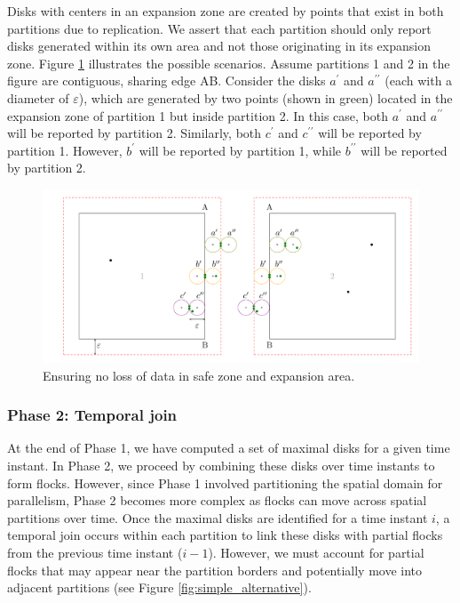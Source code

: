 Disks with centers in an expansion zone are created by points that exist in both partitions due to replication. We assert that each partition should only report disks generated within its own area and not those originating in its expansion zone. Figure \ref{fig:ensuring} illustrates the possible scenarios. Assume partitions 1 and 2 in the figure are contiguous, sharing edge AB. Consider the disks $a^\prime$ and $a^{\prime\prime}$ (each with a diameter of $\varepsilon$), which are generated by two points (shown in green) located in the expansion zone of partition 1 but inside partition 2. In this case, both $a^\prime$ and $a^{\prime\prime}$ will be reported by partition 2. Similarly, both $c^\prime$ and $c^{\prime\prime}$ will be reported by partition 1. However, $b^\prime$ will be reported by partition 1, while $b^{\prime\prime}$ will be reported by partition 2.

\begin{figure}
    \centering
    \includegraphics[width=\linewidth]{figures/merge.pdf}
    \caption{Ensuring no loss of data in safe zone and expansion area.}\label{fig:ensuring}
\end{figure}

\subsubsection{Phase 2: Temporal join}\label{sec:temporal_join}
At the end of Phase 1, we have computed a set of maximal disks for a given time instant. In Phase 2, we proceed by combining these disks over time instants to form flocks. However, since Phase 1 involved partitioning the spatial domain for parallelism, Phase 2 becomes more complex as flocks can move across spatial partitions over time. Once the maximal disks are identified for a time instant $i$, a temporal join occurs within each partition to link these disks with partial flocks from the previous time instant ($i-1$). However, we must account for partial flocks that may appear near the partition borders and potentially move into adjacent partitions (see Figure \ref{fig:simple_alternative}).

